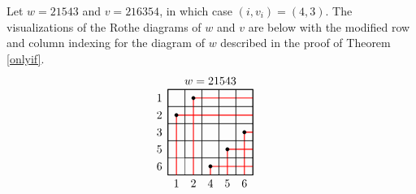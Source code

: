 \documentclass[ALCO,Unicode,published]{cedram}
\begin{document}
\begin{example}
Let $w = 21543$ and $v = 216354$, in which case $(i, v_i) = (4,3)$.  The visualizations of the Rothe diagrams of $w$ and $v$ are below with the modified row and column indexing for the diagram of $w$ described in the proof of Theorem \ref{onlyif}.  \[
 \begin{minipage}{.4\textwidth}
\hspace{0.5cm} 
  \begin{tikzpicture}[x=1.5em,y=1.5em]
      \draw[color=black, thick](0,1)rectangle(5,6);
           \node at (2.5,6.5) {$w = 21543$};
           \node at (-0.5,1.5) {$6$};
           \node at (-0.5,2.5) {$5$};
           \node at (-0.5,3.5) {$3$};
          \node at (-0.5,4.5) {$2$};
          \node at (-0.5,5.5) {$1$};
         \node at (4.5,0.5) {$6$};
           \node at (3.5,0.5) {$5$};
           \node at (2.5,0.5) {$4$};
          \node at (1.5,0.5) {$2$};
          \node at (0.5,0.5) {$1$};
      \draw[color=black](1,4)rectangle(2,5);
      \draw[color=black](3,4)rectangle(4,5);
       \draw[color=black](1,3)rectangle(2,4);
      \draw[color=black](3,3)rectangle(4,4);
      \draw[color=black](1,2)rectangle(2,3);      
     \draw[thick,color=red] (5,5.5)--(1.5,5.5)--(1.5,1);
     \draw[thick,color=red] (5,4.5)--(0.5,4.5)--(0.5,1);
     \draw[thick,color=red] (5,3.5)--(4.5,3.5)--(4.5,1);
     \draw[thick,color=red] (5,2.5)--(3.5,2.5)--(3.5,1);
     \draw[thick,color=red] (5,1.5)--(2.5,1.5)--(2.5,1);
     \filldraw [black](1.5,5.5)circle(.1);
     \filldraw [black](0.5,4.5)circle(.1);
      \filldraw [black](4.5,3.5)circle(.1);
     \filldraw [black](3.5,2.5)circle(.1);
     \filldraw [black](2.5,1.5)circle(.1);
      \draw[color=black](0,5)rectangle(1,6);
      \draw[color=black](1,5)rectangle(2,6);  
      \draw[color=black](2,5)rectangle(3,6);
      \draw[color=black](3,5)rectangle(4,6); 
      \draw[color=black](4,5)rectangle(5,6);
     \draw[color=black](0,4)rectangle(1,5); 
      \draw[color=black](2,4)rectangle(3,5);
      \draw[color=black](4,4)rectangle(5,5);
      \draw[color=black](0,3)rectangle(1,4); 
      \draw[color=black](2,3)rectangle(3,4);
      \draw[color=black](4,3)rectangle(5,4);
      \draw[color=black](0,2)rectangle(1,3); 
      \draw[color=black](2,2)rectangle(3,3);
      \draw[color=black](3,2)rectangle(4,3);
      \draw[color=black](4,2)rectangle(5,3);
      \draw[color=black](1,1)rectangle(2,2);  
      \draw[color=black](2,1)rectangle(3,2);
      \draw[color=black](3,1)rectangle(4,2); 
      \draw[color=black](4,1)rectangle(5,2);
     \end{tikzpicture}

\end{minipage}\]
\end{example}
\end{document}
